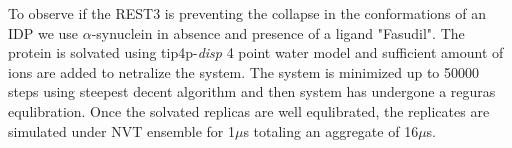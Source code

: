 To observe if the REST3 is preventing the collapse in the conformations of an IDP we use $\alpha$-synuclein in absence and presence of a ligand "Fasudil".
The protein is solvated using tip4p-\textit{disp} 4 point water model and sufficient amount of ions are added to netralize the system.
The system is minimized up to 50000 steps using steepest decent algorithm and then system has undergone a reguras equlibration.
Once the solvated replicas are well equlibrated, the replicates are simulated under NVT ensemble for 1$\mu$s totaling an aggregate of 16$\mu$s.

